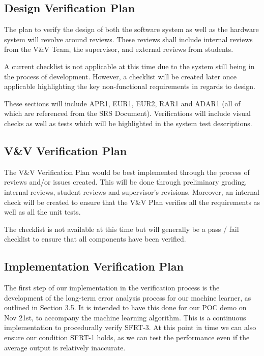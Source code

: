 \documentclass[12pt, titlepage]{article}
\begin{document}
\fancyhf{}
\fancyhead[C]{\thepage}
\renewcommand{\headrulewidth}{0pt}
\pagestyle{plain}


\subsection{Design Verification Plan}
The plan to verify the design of both the software system as well as the hardware system will revolve around reviews. These reviews shall include internal reviews from the V\&V Team, the supervisor, and external reviews from students. 
\par
A current checklist is not applicable at this time due to the system still being in the process of development. However, a checklist will be created later once applicable highlighting the key non-functional requirements in regards to design.
\par
These sections will include APR1, EUR1, EUR2, RAR1 and ADAR1 (all of which are referenced from the SRS Document). Verifications will include visual checks as well as tests which will be highlighted in the system test descriptions. 

\subsection{V\&V Verification Plan}
The V\&V Verification Plan would be best implemented through the process of reviews and/or issues created. This will be done through preliminary grading, internal reviews, student reviews and supervisor’s revisions. Moreover, an internal check will be created to ensure that the V\&V Plan verifies all the requirements as well as all the unit tests. 
\par
The checklist is not available at this time but will generally be a pass / fail checklist to ensure that all components have been verified.

\subsection{Implementation Verification Plan}

The first step of our implementation in the verification process is the development of the long-term error analysis process for our machine learner, as outlined in Section 3.5. It is intended to have this done for our POC demo on Nov 21st, to accompany the machine learning algorithm. This is a continuous implementation to procedurally verify SFRT-3. At this point in time we can also ensure our condition SFRT-1 holds, as we can test the performance even if the average output is relatively inaccurate.
\end{document}
